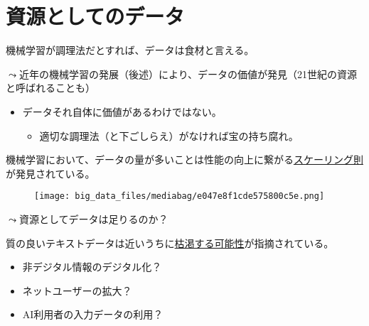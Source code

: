 \documentclass[
  xelatex,
  ja=standard]{bxjsarticle}
\providecommand{\tightlist}{%
  \setlength{\itemsep}{0pt}\setlength{\parskip}{0pt}}\usepackage{longtable,booktabs,array}
\begin{document}
\hypertarget{ux8cc7ux6e90ux3068ux3057ux3066ux306eux30c7ux30fcux30bf}{%
\section{資源としてのデータ}\label{ux8cc7ux6e90ux3068ux3057ux3066ux306eux30c7ux30fcux30bf}}

機械学習が調理法だとすれば、データは食材と言える。

\(\leadsto\)近年の機械学習の発展（後述）により、データの価値が発見（21世紀の資源と呼ばれることも）

\begin{itemize}
\tightlist
\item
  データそれ自体に価値があるわけではない。

  \begin{itemize}
  \tightlist
  \item
    適切な調理法（と下ごしらえ）がなければ宝の持ち腐れ。
  \end{itemize}
\end{itemize}

機械学習において、データの量が多いことは性能の向上に繋がる\href{https://deeplearning.hatenablog.com/entry/scaling_law}{スケーリング則}が発見されている。

\begin{figure}[htpb]

{\centering \texttt{[image: big\_data\_files/mediabag/e047e8f1cde575800c5e.png]}

}

\caption{\citet{kaplan2020}}

\end{figure}

\(\leadsto\)資源としてデータは足りるのか？

質の良いテキストデータは近いうちに\href{https://www.technologyreview.jp/s/291329/we-could-run-out-of-data-to-train-ai-language-programs/}{枯渇する可能性}が指摘されている。

\begin{itemize}
\tightlist
\item
  非デジタル情報のデジタル化？
\item
  ネットユーザーの拡大？
\item
  AI利用者の入力データの利用？
\end{itemize}


  
\end{document}
